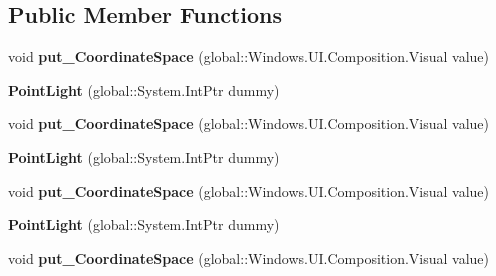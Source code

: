 \subsection*{Public Member Functions}
\begin{DoxyCompactItemize}
\item 
\mbox{\label{class_windows_1_1_u_i_1_1_composition_1_1_point_light_a1aada357d8eb2730b51c0178fdd8d371}} 
void {\bfseries put\+\_\+\+Coordinate\+Space} (global\+::\+Windows.\+U\+I.\+Composition.\+Visual value)
\item 
\mbox{\label{class_windows_1_1_u_i_1_1_composition_1_1_point_light_a4425a63d22bb7ff47b521163622a2a48}} 
{\bfseries Point\+Light} (global\+::\+System.\+Int\+Ptr dummy)
\item 
\mbox{\label{class_windows_1_1_u_i_1_1_composition_1_1_point_light_a1aada357d8eb2730b51c0178fdd8d371}} 
void {\bfseries put\+\_\+\+Coordinate\+Space} (global\+::\+Windows.\+U\+I.\+Composition.\+Visual value)
\item 
\mbox{\label{class_windows_1_1_u_i_1_1_composition_1_1_point_light_a4425a63d22bb7ff47b521163622a2a48}} 
{\bfseries Point\+Light} (global\+::\+System.\+Int\+Ptr dummy)
\item 
\mbox{\label{class_windows_1_1_u_i_1_1_composition_1_1_point_light_a1aada357d8eb2730b51c0178fdd8d371}} 
void {\bfseries put\+\_\+\+Coordinate\+Space} (global\+::\+Windows.\+U\+I.\+Composition.\+Visual value)
\item 
\mbox{\label{class_windows_1_1_u_i_1_1_composition_1_1_point_light_a4425a63d22bb7ff47b521163622a2a48}} 
{\bfseries Point\+Light} (global\+::\+System.\+Int\+Ptr dummy)
\item 
\mbox{\label{class_windows_1_1_u_i_1_1_composition_1_1_point_light_a1aada357d8eb2730b51c0178fdd8d371}} 
void {\bfseries put\+\_\+\+Coordinate\+Space} (global\+::\+Windows.\+U\+I.\+Composition.\+Visual value)

\end{DoxyCompactItemize}
